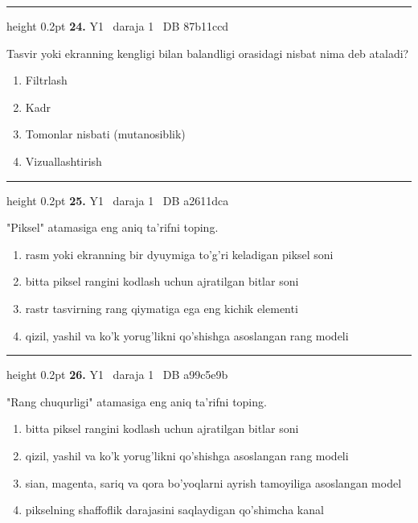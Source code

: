 \documentclass[10pt,a4paper,oneside]{article}
\begin{document}
\vspace{2mm}\hrule height 0.2pt \vspace{4mm}
\hypertarget{q24}{\textbf{\color{ink}24.}}  {\color{muted}\scriptsize Y1 \textbullet\ daraja 1 \textbullet\ DB 87b11ccd}
\par
Tasvir yoki ekranning kengligi bilan balandligi orasidagi nisbat nima deb ataladi?
\begin{enumerate}[label=\Alph*),leftmargin=9mm]
\item Filtrlash
\item Kadr
\item Tomonlar nisbati (mutanosiblik)
\item Vizuallashtirish
\end{enumerate}
\vspace{2mm}\hrule height 0.2pt \vspace{4mm}
\hypertarget{q25}{\textbf{\color{ink}25.}}  {\color{muted}\scriptsize Y1 \textbullet\ daraja 1 \textbullet\ DB a2611dca}
\par
"Piksel" atamasiga eng aniq ta'rifni toping.
\begin{enumerate}[label=\Alph*),leftmargin=9mm]
\item rasm yoki ekranning bir dyuymiga to'g'ri keladigan piksel soni
\item bitta piksel rangini kodlash uchun ajratilgan bitlar soni
\item rastr tasvirning rang qiymatiga ega eng kichik elementi
\item qizil, yashil va ko'k yorug'likni qo'shishga asoslangan rang modeli
\end{enumerate}
\vspace{2mm}\hrule height 0.2pt \vspace{4mm}
\hypertarget{q26}{\textbf{\color{ink}26.}}  {\color{muted}\scriptsize Y1 \textbullet\ daraja 1 \textbullet\ DB a99c5e9b}
\par
"Rang chuqurligi" atamasiga eng aniq ta'rifni toping.
\begin{enumerate}[label=\Alph*),leftmargin=9mm]
\item bitta piksel rangini kodlash uchun ajratilgan bitlar soni
\item qizil, yashil va ko'k yorug'likni qo'shishga asoslangan rang modeli
\item sian, magenta, sariq va qora bo'yoqlarni ayrish tamoyiliga asoslangan model
\item pikselning shaffoflik darajasini saqlaydigan qo'shimcha kanal
\end{enumerate}
\end{document}
